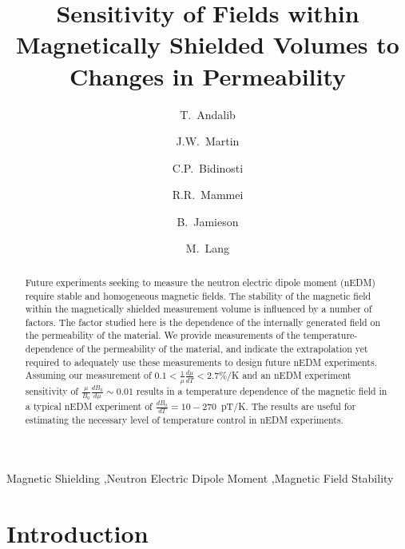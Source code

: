 \documentclass[review]{elsarticle}
\begin{document}
\begin{frontmatter}

\title{Sensitivity of Fields within Magnetically Shielded Volumes to
  Changes in Permeability}

\author[manitoba]{T.~Andalib}
\author[winnipeg,manitoba]{J.W.~Martin}
\author[winnipeg,manitoba]{C.P.~Bidinosti}
\author[winnipeg,manitoba]{R.R.~Mammei}
\author[winnipeg,manitoba]{B.~Jamieson}
\author[manitoba]{M.~Lang}



\address[winnipeg]{Physics Department, The University of Winnipeg, 515 Portage Avenue, Winnipeg, MB, R3B 2E9, Canada}
\address[manitoba]{Department of Physics and Astronomy, University of Manitoba, Winnipeg, MB R3T 2N2, Canada}


\begin{abstract}
Future experiments seeking to measure the neutron electric dipole
moment (nEDM) require stable and homogeneous magnetic fields.  The
stability of the magnetic field within the magnetically shielded
measurement volume is influenced by a number of factors.  The factor
studied here is the dependence of the internally generated field on
the permeability of the material.  We provide measurements of the
temperature-dependence of the permeability of the material, and
indicate the extrapolation yet required to adequately use these
measurements to design future nEDM experiments.  Assuming our
measurement of $0.1<\frac{1}{\mu}\frac{d\mu}{dT}<2.7$\%/K and an nEDM
experiment sensitivity of $\frac{\mu}{B_0}\frac{dB_0}{d\mu}\sim 0.01$
results in a temperature dependence of the magnetic field in a typical
nEDM experiment of $\frac{dB_0}{dT}=10-270$~pT/K.  The results are
useful for estimating the necessary level of temperature control in
nEDM experiments.
\end{abstract}

\begin{keyword}
Magnetic Shielding \sep Neutron Electric Dipole Moment \sep Magnetic Field Stability
\end{keyword}

\end{frontmatter}

\linenumbers

\section{Introduction}
\end{document}
